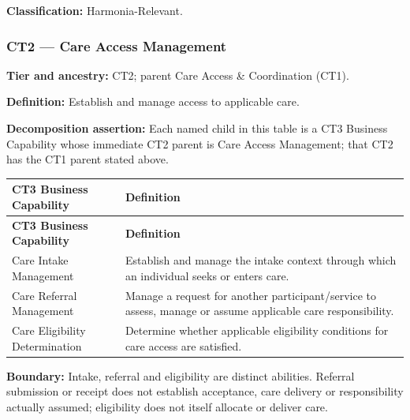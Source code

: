 \label{rad:business:368}

\textbf{Classification:} Harmonia-Relevant.

\label{rad:business:370}
\subsubsection*{CT2 — Care Access Management}
\label{rad:business:372}

\textbf{Tier and ancestry:} CT2; parent Care Access \& Coordination (CT1).

\label{rad:business:374}

\textbf{Definition:} Establish and manage access to applicable care.

\label{rad:business:376}

\textbf{Decomposition assertion:} Each named child in this table is a CT3 Business Capability whose immediate CT2 parent is Care Access Management; that CT2 has the CT1 parent stated above.

\label{rad:business:378}
\begingroup\small\setlength{\TableWidth}{\dimexpr\linewidth-4\tabcolsep-3\arrayrulewidth\relax}
\begin{longtable}{|>{\raggedright\arraybackslash}p{0.35\TableWidth}|>{\raggedright\arraybackslash}p{0.65\TableWidth}|}
\hline\rowcolor{TableHead}\textbf{CT3 Business Capability} & \textbf{Definition}\\\hline\endfirsthead
\hline\rowcolor{TableHead}\textbf{CT3 Business Capability} & \textbf{Definition}\\\hline\endhead
\hline\endfoot
Care Intake Management & Establish and manage the intake context through which an individual seeks or enters care.\\\hline
Care Referral Management & Manage a request for another participant/\allowbreak{}service to assess, manage or assume applicable care responsibility.\\\hline
Care Eligibility Determination & Determine whether applicable eligibility conditions for care access are satisfied.\\\hline
\end{longtable}\endgroup
{}\label{rad:business:384}

\textbf{Boundary:} Intake, referral and eligibility are distinct abilities. Referral submission or receipt does not establish acceptance, care delivery or responsibility actually assumed; eligibility does not itself allocate or deliver care.

